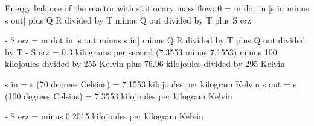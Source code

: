 Energy balance of the reactor with stationary mass flow:  
0 = m dot in [s in minus s out] plus Q R divided by T minus Q out divided by T plus S erz  

- S erz = m dot in [s out minus s in] minus Q R divided by T plus Q out divided by T  
- S erz = 0.3 kilograms per second (7.3553 minus 7.1553) minus 100 kilojoules divided by 255 Kelvin plus 76.96 kilojoules divided by 295 Kelvin  

s in = s (70 degrees Celsius) = 7.1553 kilojoules per kilogram Kelvin  
s out = s (100 degrees Celsius) = 7.3553 kilojoules per kilogram Kelvin  

- S erz = minus 0.2015 kilojoules per kilogram Kelvin